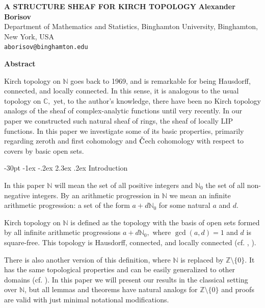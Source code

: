 \documentclass[10pt]{article}
\makeatletter
\renewcommand\section{\@startsection {section}{1}{\z@}
{-30pt \@plus -1ex \@minus -.2ex}
{2.3ex \@plus.2ex}
{\normalfont\normalsize\bfseries\boldmath}}
\theoremstyle{definition}
\makeatother
\begin{document}
		

																													
\begin{center}
\uppercase{\bf \boldmath A Structure Sheaf for Kirch Topology}
\vskip 20pt
{\bf Alexander Borisov}\\
{\smallit Department of Mathematics and Statistics, Binghamton University, Binghamton, New York, USA}\\
{\tt aborisov@binghamton.edu}\\ 
\end{center}
\vskip 20pt
\vskip 30pt

																														
\centerline{\bf Abstract}
\noindent
Kirch topology on $\mathbb N$ goes back to 1969, and is remarkable for being Hausdorff,  connected, and locally connected. In this sense, it is analogous to the usual topology on $\mathbb C,$ yet, to the author's knowledge, there have been no Kirch topology analogs of the sheaf of complex-analytic functions until very recently. In our paper \cite{LIP} we constructed such natural sheaf of rings, the sheaf of locally LIP functions. In this paper we investigate some of its basic properties, primarily regarding zeroth and first cohomology and $\check{\textrm C}$ech cohomology with respect to covers by basic open sets.

\thispagestyle{empty}
\baselineskip=12.875pt
\vskip 30pt

\section{Introduction}%

In this paper $\mathbb N$ will mean the set of all positive integers and $\mathbb N_0$ the set of all non-negative integers. By an arithmetic progression in $\mathbb N$ we mean an infinite arithmetic progression: a set of the form $a+d\mathbb N_0$ for some natural $a$ and $d.$

Kirch topology on $\mathbb N$ is defined as the topology with the basis of open sets formed by all infinite arithmetic progressions $a+d\mathbb N_0,$ where  $\gcd (a,d)=1$ and $d$ is square-free. This topology is Hausdorff, connected, and locally connected (cf. \cite{Kirch}, \cite{Szczuka}). 

There is also another version of this definition, where $\mathbb N$ is replaced by $\mathbb Z \setminus \{0\}.$ It has the same topological properties and can be easily generalized to other domains (cf. \cite{Clarketal}). In this paper we will present our results in the classical setting over $\mathbb N$, but all lemmas and theorems have natural analogs for $\mathbb Z \setminus \{0\}$ and proofs are valid with just minimal notational modifications. 
\end{document}
